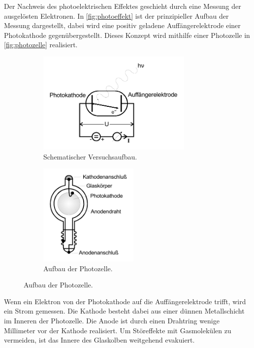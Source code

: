 Der Nachweis des photoelektrischen Effektes geschieht durch eine Messung der ausgelösten Elektronen.
In \autoref{fig:photoeffekt} ist der prinzipieller Aufbau der Messung dargestellt,
dabei wird eine positiv geladene Auffängerelektrode einer Photokathode gegenübergestellt.
Dieses Konzept wird mithilfe einer Photozelle in \autoref{fig:photozelle} realisiert.
\begin{figure}
    \begin{subfigure}{0.48\textwidth}
        \centering
        \includegraphics[height=5cm]{bilder/photoeffekt_schema.pdf}
        \caption{Schematischer Versuchsaufbau. \cite{v500}}
        \label{fig:photoeffekt}
    \end{subfigure}
    \hfill
    \begin{subfigure}{0.48\textwidth}
        \centering
        \includegraphics[height=5cm]{bilder/photozelle_aufbau.pdf}
        \caption{Aufbau der Photozelle. \cite{v500}}
        \label{fig:photozelle}
    \end{subfigure}
\end{figure}

Wenn ein Elektron von der Photokathode auf die Auffängerelektrode trifft, wird ein Strom gemessen.
Die Kathode besteht dabei aus einer dünnen Metallschicht im Inneren der Photozelle.
Die Anode ist durch einen Drahtring wenige Millimeter vor der Kathode realisiert. 
Um Störeffekte mit Gasmolekülen zu vermeiden, ist das Innere des Glaskolben weitgehend evakuiert.

